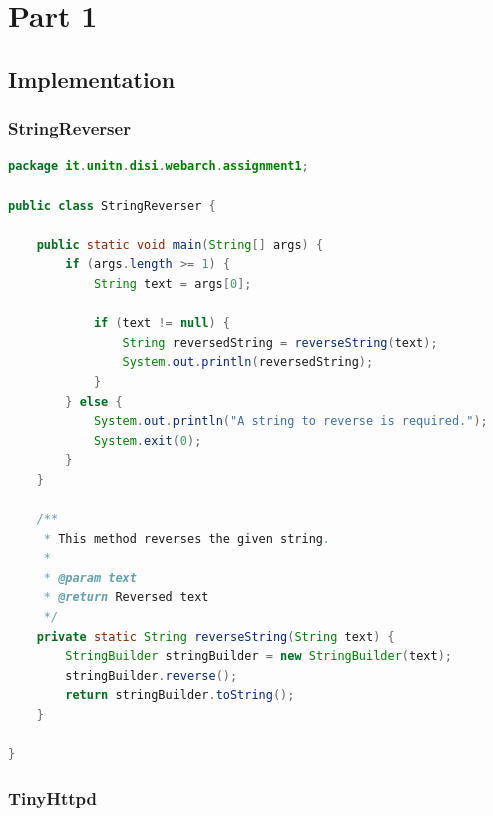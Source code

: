 \documentclass{article}
\begin{document}
\pagebreak
\appendix
{}

\section{Part 1}

\subsection{Implementation}

\subsubsection{StringReverser}

\begin{lstlisting}[label=lst:01_part1_impl_stringreverser_code, caption=CLI command to start a GitLab runner in a Docker container, language=java, numbers=none]
package it.unitn.disi.webarch.assignment1;

public class StringReverser {

    public static void main(String[] args) {
        if (args.length >= 1) {
            String text = args[0];

            if (text != null) {
                String reversedString = reverseString(text);
                System.out.println(reversedString);
            }
        } else {
            System.out.println("A string to reverse is required.");
            System.exit(0);
        }
    }

    /**
     * This method reverses the given string.
     *
     * @param text
     * @return Reversed text
     */
    private static String reverseString(String text) {
        StringBuilder stringBuilder = new StringBuilder(text);
        stringBuilder.reverse();
        return stringBuilder.toString();
    }

}
\end{lstlisting}

\subsubsection{TinyHttpd}
\end{document}
